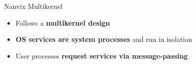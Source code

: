 		\begin{frame}[fragile]{Nanvix Multikernel}

			\begin{itemize}
				\item Follows a \textbf{multikernel design}
				\item \textbf{OS services are system processes} and run in isolation
				\item User processes \textbf{request services via message-passing}
			\end{itemize}


		\end{frame}

